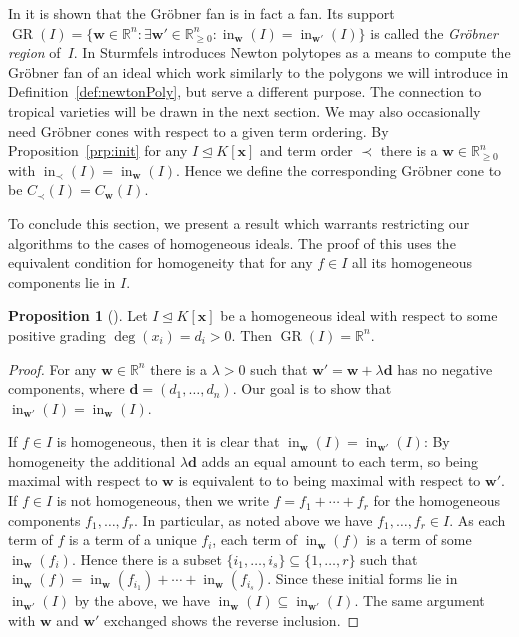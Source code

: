 \documentclass[
  paper=a4,
  titlepage,
  bibliography=totoc,
  pagesize=pdftex
]{scrartcl}
\numberwithin{figure}{section}
\numberwithin{equation}{section}
\numberwithin{table}{section}
\newcommand*\setR{\mathds{R}}
\let\vec\mathbf
\let\idealof\trianglelefteq
\DeclareMathOperator{\initial}{in}
\DeclareMathOperator{\GR}{GR}
\theoremstyle{definition}
\newtheorem{proposition}[definition]{Proposition}
\numberwithin{definition}{section}
\begin{document}
In \cite[Theorem~2.19]{compGrobFan} it is shown that the Gröbner fan is in fact a fan. Its
support $\GR(I) = \{ \vec w \in \setR^n : \exists \vec w' \in \setR^n_{\geq0} :
\initial_{\vec w}(I) = \initial_{\vec w'}(I)\}$ is called the \emph{Gröbner region}
of~$I$. In \cite{SturmGBCP} Sturmfels introduces Newton polytopes as a means to compute
the Gröbner fan of an ideal which work similarly to the polygons we will introduce in
Definition~\ref{def:newtonPoly}, but serve a different purpose. The connection to tropical
varieties will be drawn in the next section. We may also occasionally need Gröbner cones
with respect to a given term ordering. By Proposition~\ref{prp:init} for any $I \idealof
K[\vec x]$ and term order $\prec$ there is a $\vec w \in \setR^n_{\geq0}$ with
$\initial_\prec(I) = \initial_{\vec w}(I)$. Hence we define the corresponding Gröbner cone
to be $C_\prec(I) = C_{\vec w}(I)$.

To conclude this section, we present a result which warrants restricting our algorithms to
the cases of homogeneous ideals. The proof of this uses the equivalent condition for
homogeneity that for any $f \in I$ all its homogeneous components lie in $I$.

\begin{proposition}[{\cite[Proposition~1.12]{SturmGBCP}}]
  \label{prp:grRegion}
  Let $I \idealof K[\vec x]$ be a homogeneous ideal with respect to some positive grading
  $\deg(x_i) = d_i > 0$. Then $\GR(I) = \setR^n$.
  \begin{proof}
    For any $\vec w \in \setR^n$ there is a $\lambda > 0$ such that $\vec w' = \vec w +
    \lambda \vec d$ has no negative components, where $\vec d = (d_1, \dots, d_n)$. Our
    goal is to show that $\initial_{\vec w'}(I) = \initial_{\vec w}(I)$.

    If $f \in I$ is homogeneous, then it is clear that $\initial_{\vec w}(I) =
    \initial_{\vec w'}(I)$: By homogeneity the additional $\lambda \vec d$ adds an equal
    amount to each term, so being maximal with respect to $\vec w$ is equivalent to to
    being maximal with respect to $\vec w'$. If $f \in I$ is not homogeneous, then we
    write $f = f_1 + \cdots + f_r$ for the homogeneous components $f_1,\dots,f_r$. In
    particular, as noted above we have $f_1, \dots, f_r \in I$. As each term of $f$ is a
    term of a unique $f_i$, each term of $\initial_{\vec w}(f)$ is a term of some
    $\initial_{\vec w}(f_i)$. Hence there is a subset $\{i_1, \dots, i_s\} \subseteq \{1,
    \dots, r\}$ such that $\initial_{\vec w}(f) = \initial_{\vec w}(f_{i_1}) + \cdots +
    \initial_{\vec w}(f_{i_s})$. Since these initial forms lie in $\initial_{\vec w'}(I)$
    by the above, we have $\initial_{\vec w}(I) \subseteq \initial_{\vec w'}(I)$. The same
    argument with $\vec w$ and $\vec w'$ exchanged shows the reverse inclusion.
  \end{proof}
\end{proposition}
\end{document}
